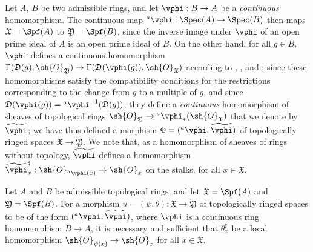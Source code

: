 \begin{env}[10.2.1]
\label{I.10.2.1}
Let $A$, $B$ be two admissible rings, and let $\vphi:B\to A$ be a \emph{continuous} homomorphism.
The continuous map ${}^a\vphi:\Spec(A)\to\Spec(B)$  then maps $\mathfrak{X}=\Spf(A)$ to $\mathfrak{Y}=\Spf(B)$, since the inverse image under $\vphi$ of an open prime ideal of $A$ is an open prime ideal of $B$.
On the other hand, for all $g\in B$, $\vphi$ defines a continuous homomorphism $\Gamma(\mathfrak{D}(g),\sh{O}_\mathfrak{Y})\to\Gamma(\mathfrak{D}(\vphi(g)),\sh{O}_\mathfrak{X})$ according to , , and ;
since these homomorphisms satisfy the compatibility conditions for the restrictions corresponding to the change from $g$ to a multiple of $g$, and since $\mathfrak{D}(\vphi(g))={}^a\vphi^{-1}(\mathfrak{D}(g))$, they define a \emph{continuous} homomorphism of sheaves of topological rings $\sh{O}_\mathfrak{Y}\to{}^a\vphi_*(\sh{O}_\mathfrak{X})$  that we denote by $\widetilde{\vphi}$;
we have thus defined a morphism $\Phi=({}^a\vphi,\widetilde{\vphi})$ of topologically ringed spaces $\mathfrak{X}\to\mathfrak{Y}$.
We note that, as a homomorphism of sheaves of rings without topology, $\widetilde{\vphi}$ defines a homomorphism $\widetilde{\vphi}_x^\sharp:\sh{O}_{{}^a\vphi(x)}\to\sh{O}_x$ on the stalks, for all $x\in\mathfrak{X}$.
\end{env}

\begin{proposition}[10.2.2]
\label{I.10.2.2}
Let $A$ and $B$ be admissible topological rings, and let $\mathfrak{X}=\Spf(A)$ and $\mathfrak{Y}=\Spf(B)$.
For a morphism $u=(\psi,\theta):\mathfrak{X}\to\mathfrak{Y}$ of topologically ringed spaces to be of the form $({}^a\vphi,\widetilde{\vphi})$, where $\vphi$ is a continuous ring homomorphism $B\to A$, it is necessary and sufficient that $\theta_x^\sharp$ be a local homomorphism $\sh{O}_{\psi(x)}\to\sh{O}_x$ for all $x\in\mathfrak{X}$.
\end{proposition}

